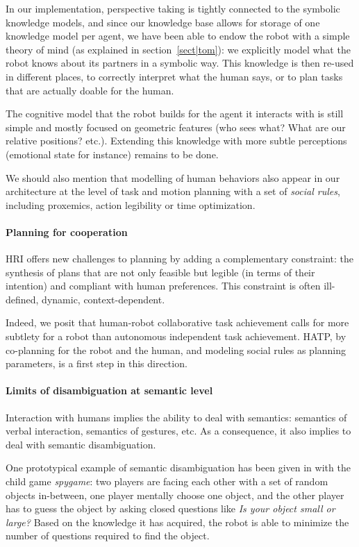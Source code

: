 \documentclass[preprint,3p,times]{elsarticle}
\begin{document}
In our implementation, perspective taking is tightly connected to the symbolic
knowledge models, and since our knowledge base allows for storage of one
knowledge model per agent, we have been able to endow the robot with a simple
theory of mind (as explained in section~\ref{sect|tom}): we explicitly model
what the robot knows about its partners in a symbolic way. This knowledge is
then re-used in different places, to correctly interpret what the human says,
or to plan tasks that are actually doable for the human.

The cognitive model that the robot builds for the agent it interacts with is
still simple and mostly focused on geometric features (who sees what? What are
our relative positions? etc.). Extending this knowledge with more subtle
perceptions (emotional state for instance) remains to be done.

We should also mention that modelling of human behaviors also appear in our
architecture at the level of task and motion planning with a set of
\emph{social rules}, including proxemics, action legibility or time
optimization.

\paragraph{Planning for cooperation} HRI offers new challenges to planning
by adding a complementary constraint: the synthesis of plans that are not only
feasible but legible (in terms of their intention) and compliant with human
preferences. This constraint is often ill-defined, dynamic, context-dependent.

Indeed, we posit that human-robot collaborative task achievement calls for more
subtlety for a robot than autonomous independent task achievement. HATP, by
co-planning for the robot and the human, and modeling social rules as planning
parameters, is a first step in this direction.

\paragraph{Limits of disambiguation at semantic level}

Interaction with humans implies the ability to deal with semantics: semantics of
verbal interaction, semantics of gestures, etc.  As a consequence, it also
implies to deal with semantic disambiguation.

One prototypical example of semantic disambiguation has been given in
\cite{Ros2010b} with the child game \emph{spygame}: two players are facing
each other with a set of random objects in-between, one player mentally choose
one object, and the other player has to guess the object by asking closed
questions like \emph{Is your object small or large?} Based on the knowledge it
has acquired, the robot is able to minimize the number of questions required to
find the object.
\end{document}
